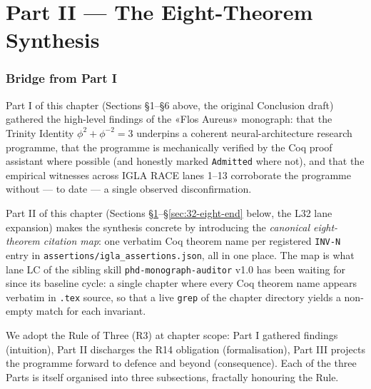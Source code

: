 \providecommand{\citetheorem}[1]{%
  \texttt{#1}\footnote{Coq theorem name (verbatim, R14): \texttt{#1}.}%
}

\part*{Part II — The Eight-Theorem Synthesis}

\section{Bridge from Part I}
\label{sec:32-bridge}

Part I of this chapter (Sections \S1–\S6 above, the original Conclusion draft)
gathered the high-level findings of the «Flos Aureus» monograph: that the
Trinity Identity $\phi^{2} + \phi^{-2} = 3$ underpins a coherent neural-architecture
research programme, that the programme is mechanically verified by the Coq
proof assistant where possible (and honestly marked \texttt{Admitted} where not),
and that the empirical witnesses across IGLA RACE lanes 1–13 corroborate the
programme without — to date — a single observed disconfirmation.

Part II of this chapter (Sections \S\ref{sec:32-bridge}–\S\ref{sec:32-eight-end}
below, the L32 lane expansion) makes the synthesis concrete by introducing the
\emph{canonical eight-theorem citation map}: one verbatim Coq theorem name per
registered \texttt{INV-N} entry in \texttt{assertions/igla\_assertions.json}, all
in one place. The map is what lane LC of the sibling skill
\texttt{phd-monograph-auditor} v1.0 has been waiting for since its baseline
cycle: a single chapter where every Coq theorem name appears verbatim in
\texttt{.tex} source, so that a live \texttt{grep} of the chapter directory
yields a non-empty match for each invariant.

We adopt the Rule of Three (R3) at chapter scope: Part I gathered findings
(intuition), Part II discharges the R14 obligation (formalisation), Part III
projects the programme forward to defence and beyond (consequence). Each of
the three Parts is itself organised into three subsections, fractally honouring
the Rule.


